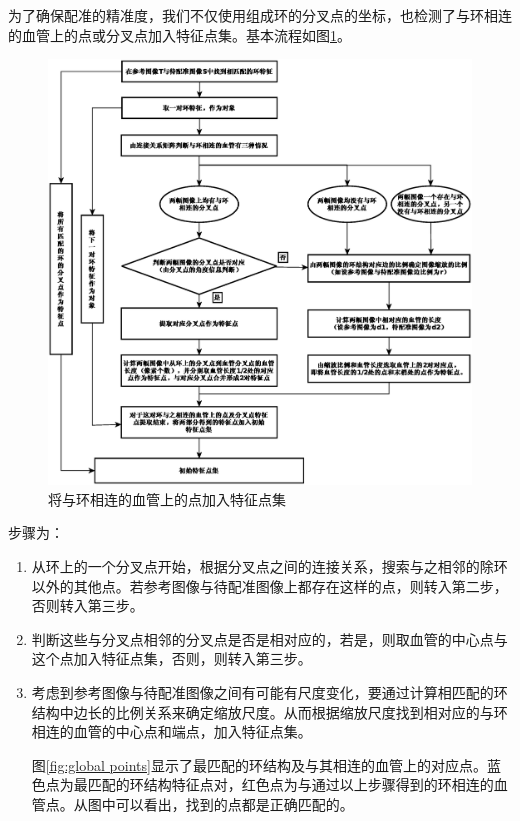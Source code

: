 为了确保配准的精准度，我们不仅使用组成环的分叉点的坐标，也检测了与环相连的血管上的点或分叉点加入特征点集。基本流程如图\ref{fig:global}。
\begin{figure}[!ht]
  \centering
  \includegraphics[width=1\textwidth]{figures/global}
  \caption{将与环相连的血管上的点加入特征点集}
  \label{fig:global}
\end{figure}

步骤为：
\begin{enumerate}
\item 从环上的一个分叉点开始，根据分叉点之间的连接关系，搜索与之相邻的除环以外的其他点。若参考图像与待配准图像上都存在这样的点，则转入第二步，否则转入第三步。
\item 判断这些与分叉点相邻的分叉点是否是相对应的，若是，则取血管的中心点与这个点加入特征点集，否则，则转入第三步。
\item 考虑到参考图像与待配准图像之间有可能有尺度变化，要通过计算相匹配的环结构中边长的比例关系来确定缩放尺度。从而根据缩放尺度找到相对应的与环相连的血管的中心点和端点，加入特征点集。

图\ref{fig:global points}显示了最匹配的环结构及与其相连的血管上的对应点。蓝色点为最匹配的环结构特征点对，红色点为与通过以上步骤得到的环相连的血管点。从图中可以看出，找到的点都是正确匹配的。
\end{enumerate}


